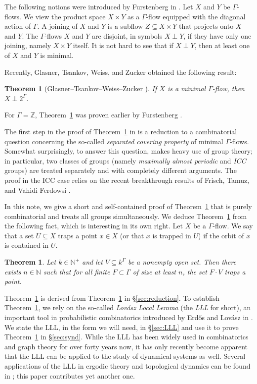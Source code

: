 \documentclass[11pt, reqno, psamsfonts]{amsart}
\theoremstyle{bfnote}
\newtheorem{theo}[equation]{Theorem}
\theoremstyle{claim}
\theoremstyle{definition}
\theoremstyle{remark}
\newcommand{\0}{\varnothing}
\newcommand{\N}{{\mathbb{N}}}
\newcommand{\Z}{\mathbb{Z}}
\renewcommand{\G}{\Gamma}
\newcommand{\emphd}[1]{{\fontseries{b}\selectfont\textsf{#1}}}
\newcommand{\bemph}[1]{{\normalfont#1}} %
\newcommand{\ep}[1]{\bemph{(}#1\bemph{)}} %
\numberwithin{equation}{section}
\begin{document}
	The following notions were introduced by Furstenberg in \cite{Furstenberg}. Let $X$ and $Y$ be $\G$-flows. We view the product space $X \times Y$ as a $\G$-flow equipped with the diagonal action of $\G$. A \emphd{joining} of $X$ and $Y$ is a subflow $Z \subseteq X \times Y$ that projects onto $X$ and $Y$. The $\G$-flows $X$ and $Y$ are \emphd{disjoint}, in symbols $X \perp Y$, if they have only one joining, namely $X \times Y$ itself. It is not hard to see that if $X \perp Y$, then at least one of $X$ and $Y$ is minimal.
	
	Recently, Glasner, Tsankov, Weiss, and Zucker obtained the following result:

	\begin{theo}[{Glasner--Tsankov--Weiss--Zucker \cite{GTWZ}}]\label{theo:disj}
		If $X$ is a minimal $\G$-flow, then $X \perp 2^\G$.
	\end{theo}

	For $\G = \Z$, Theorem~\ref{theo:disj} was proven earlier by Furstenberg \cite{Furstenberg}. 
	
	The first step in the proof of Theorem~\ref{theo:disj} in \cite{GTWZ} is a reduction to a combinatorial question concerning the so-called \emph{separated covering property} of minimal $\G$-flows. Somewhat surprisingly, to answer this question, \cite{GTWZ} makes heavy use of group theory; in particular, two classes of groups \ep{namely \emph{maximally almost periodic} and \emph{ICC} groups} are treated separately and with completely different arguments. The proof in the ICC case relies on the recent breakthrough results of Frisch, Tamuz, and Vahidi Ferdowsi \cite{FTF}.
	
	In this note, we give a short and self-contained proof of Theorem~\ref{theo:disj} that is purely combinatorial and treats all groups simultaneously. We deduce Theorem~\ref{theo:disj} from the following fact, which is interesting in its own right. Let $X$ be a $\G$-flow. We say that a set $U \subseteq X$ \emphd{traps} a point $x \in X$ \ep{or that $x$ is \emphd{trapped} in $U$} if the orbit of $x$ is contained in $U$.

	\begin{theo}\label{theo:synd}
		Let $k \in \N^+$ and let $V \subseteq k^\G$ be a nonempty open set. Then there exists $n \in \N$ such that for all finite $F \subset \G$ of size at least $n$, the set $F \cdot V$ traps a point.
	\end{theo}

	Theorem~\ref{theo:disj} is derived from Theorem~\ref{theo:synd} in \S\ref{sec:reduction}. To establish Theorem~\ref{theo:synd}, we rely on the so-called \emph{Lov\'asz Local Lemma} \ep{the \emph{LLL} for short}, an important tool in probabilistic combinatorics introduced by Erd\H{o}s and Lov\'asz in \cite{EL}.
	We state the LLL, in the form we will need, in \S\ref{sec:LLL} and use it to prove Theorem~\ref{theo:synd} in \S\ref{sec:synd}. While the LLL has been widely used in combinatorics and graph theory for over forty years now, it has only recently become apparent that the LLL can be applied to the study of dynamical systems as well. Several applications of the LLL in ergodic theory and topological dynamics can be found in \cite{ABT, LSS, MLLL, AW}; this paper contributes yet another one.
\end{document}
